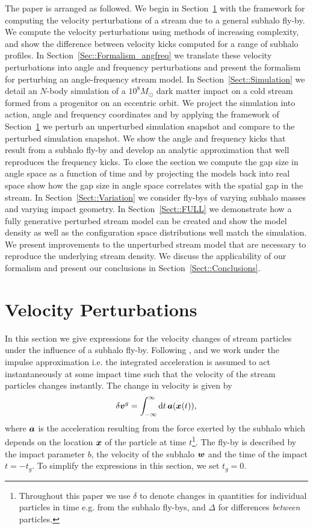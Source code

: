 \documentclass[useAMS,usenatbib,fleqn,a4paper]{mn2e}
\newcommand{\bs}[1]{\bmath{#1}}
\begin{document}
The paper is arranged as followed. We begin in Section~\ref{Sect::Formalism} with the framework for computing the velocity perturbations of a stream due to a general subhalo fly-by. We compute the velocity perturbations using methods of increasing complexity, and show the difference between velocity kicks computed for a range of subhalo profiles. In Section~\ref{Sec::Formalism_angfreq} we translate these velocity perturbations into angle and frequency perturbations and present the formalism for perturbing an angle-frequency stream model. In Section~\ref{Sect::Simulation} we detail an $N$-body simulation of a $10^8M_\odot$ dark matter impact on a cold stream formed from a progenitor on an eccentric orbit. We project the simulation into action, angle and frequency coordinates and by applying the framework of Section~\ref{Sect::Formalism} we perturb an unperturbed simulation snapshot and compare to the perturbed simulation snapshot. We show the angle and frequency kicks that result from a subhalo fly-by and develop an analytic approximation that well reproduces the frequency kicks. To close the section we compute the gap size in angle space as a function of time and by projecting the models back into real space show how the gap size in angle space correlates with the spatial gap in the stream.  In Section~\ref{Sect::Variation} we consider fly-bys of varying subhalo masses and varying impact geometry. In Section~\ref{Sect::FULL} we demonstrate how a fully generative perturbed stream model can be created and show the model density as well as the configuration space distributions well match the simulation. We present improvements to the unperturbed stream model that are necessary to reproduce the underlying stream density. We discuss the applicability of our formalism and present our conclusions in Section~\ref{Sect::Conclusions}.

\section{Velocity Perturbations}\label{Sect::Formalism}
In this section we give expressions for the velocity changes of stream particles under the influence of a subhalo fly-by. Following \cite{YoonJohnstonHogg}, \cite{Carlberg2013} and \cite{ErkalBelokurov2015} we work under the impulse approximation i.e. the integrated acceleration is assumed to act instantaneously at some impact time such that the velocity of the stream particles changes instantly. The change in velocity is given by
\begin{equation}
\delta\bs{v}^g = \int_{-\infty}^{\infty} \mathrm{d} t\,\bs{a}(\bs{x}(t)),
\end{equation}
where $\bs{a}$ is the acceleration resulting from the force exerted by the subhalo which depends on the location $\bs{x}$ of the particle at time $t$\footnote{Throughout this paper we use $\delta$ to denote changes in quantities for individual particles in time e.g. from the subhalo fly-bys, and $\Delta$ for differences \emph{between} particles.}. The fly-by is described by the impact parameter $b$, the velocity of the subhalo $\bs{w}$ and the time of the impact $t=-t_g$. To simplify the expressions in this section, we set $t_g=0$.
\end{document}

